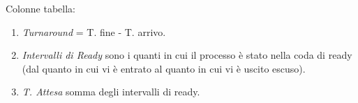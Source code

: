 Colonne tabella:
\begin{enumerate}
	\item \textit{Turnaround} = T. fine - T. arrivo.
	\item \textit{Intervalli di Ready} sono i quanti in cui il processo è stato nella coda di ready (dal quanto in cui vi è entrato al quanto in cui vi è uscito escuso).
	\item \textit{T. Attesa} somma degli intervalli di ready.
\end{enumerate}